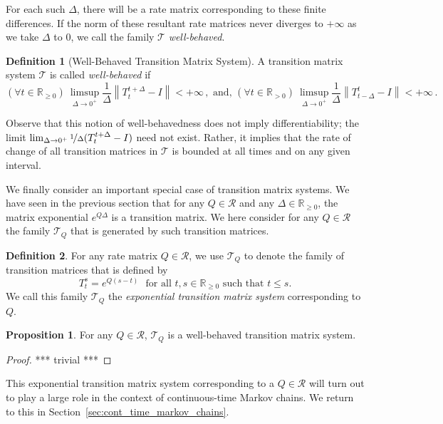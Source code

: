 \documentclass[10pt,a4paper]{paper}
\theoremstyle{definition}
\newtheorem{proposition}[theorem]{Proposition}
\newtheorem{definition}{Definition}
\newcommand{\reals}{\mathbb{R}}
\newcommand{\realspos}{\reals_{>0}}
\newcommand{\realsnonneg}{\reals_{\geq 0}}
\newcommand{\norm}[1]{\left\lVert #1 \right\rVert}
\begin{document}
For each such $\Delta$, there will be a rate matrix corresponding to these finite differences. If the norm of these resultant rate matrices never diverges to $+\infty$ as we take $\Delta$ to $0$, we call the family $\mathcal{T}$ \emph{well-behaved}.

\begin{definition}[Well-Behaved Transition Matrix System]\label{def:well_behaved_trans_mat_system}
A transition matrix system $\mathcal{T}$ is called \emph{well-behaved} if 
\begin{equation}\label{eq:wellbehavedtransitionmatrixsystem}%
(\forall t\in\realsnonneg)~\limsup_{\Delta\to 0^{+}}\frac{1}{\Delta}\norm{T_{t}^{t+\Delta}-I}<+\infty\,,
\text{~and,~}
(\forall t\in\realspos)~\limsup_{\Delta\to 0^{+}}\frac{1}{\Delta}\norm{T_{t-\Delta}^t-I}<+\infty\,.
\end{equation}
\end{definition}

Observe that this notion of well-behavedness does not imply differentiability; the limit $\lim_{\Delta\to0^+}\nicefrac{1}{\Delta}(T_t^{t+\Delta}-I)$ need not exist. Rather, it implies that the rate of change of all transition matrices in $\mathcal{T}$ is bounded at all times and on any given interval.

We finally consider an important special case of transition matrix systems. We have seen in the previous section that for any $Q\in\mathcal{R}$ and any $\Delta\in\realsnonneg$, the matrix exponential $e^{Q\Delta}$ is a transition matrix. We here consider for any $Q\in\mathcal{R}$ the family $\mathcal{T}_Q$ that is generated by such transition matrices.
\begin{definition}\label{def:systemfromQ}For any rate matrix $Q\in\mathcal{R}$, we use $\mathcal{T}_Q$ to denote the family of transition matrices that is defined by
\begin{equation*}
T_t^s=e^{Q(s-t)}
\text{~~for all $t,s\in\realsnonneg$ such that $t\leq s$.}
\end{equation*}
We call this family $\mathcal{T}_Q$ the \emph{exponential transition matrix system} corresponding to $Q$.
\end{definition}


\begin{proposition}
\label{prop:systemQ}
For any $Q\in\mathcal{R}$, $\mathcal{T}_Q$ is a well-behaved transition matrix system.
\end{proposition}
\begin{proof}
*** trivial ***
\end{proof}
This exponential transition matrix system corresponding to a $Q\in\mathcal{R}$ will turn out to play a large role in the context of continuous-time Markov chains. We return to this in Section~\ref{sec:cont_time_markov_chains}.
\end{document}
